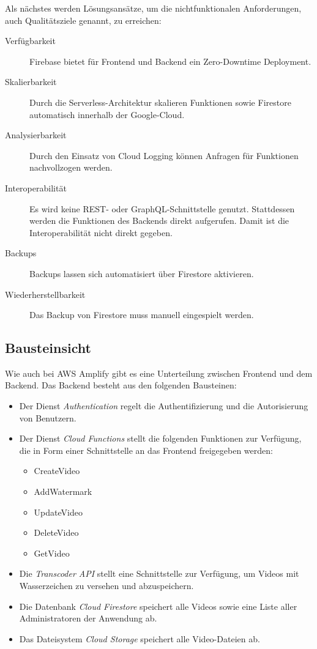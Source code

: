 Als nächstes werden Lösungsansätze, um die nichtfunktionalen Anforderungen, auch Qualitätsziele genannt, zu erreichen:

\begin{description}
   \item[Verfügbarkeit] Firebase bietet für Frontend und Backend ein Zero-Downtime Deployment.
   \item[Skalierbarkeit] Durch die Serverless-Architektur skalieren Funktionen sowie Firestore automatisch innerhalb der Google-Cloud.
   \item[Analysierbarkeit] Durch den Einsatz von Cloud Logging können Anfragen für Funktionen nachvollzogen werden.
   \item[Interoperabilität] Es wird keine \ac{REST}- oder GraphQL-Schnittstelle genutzt. Stattdessen werden die Funktionen des Backends direkt aufgerufen. Damit ist die Interoperabilität nicht direkt gegeben.
   \item[Backups] Backups lassen sich automatisiert über Firestore aktivieren.
   \item[Wiederherstellbarkeit] Das Backup von Firestore muss manuell eingespielt werden.
\end{description}

\subsection{Bausteinsicht}

Wie auch bei \ac{AWS} Amplify gibt es eine Unterteilung zwischen Frontend und dem Backend. Das Backend besteht aus den folgenden Bausteinen:

\begin{itemize}
  \item{Der Dienst \textit{Authentication} regelt die Authentifizierung und die Autorisierung von Benutzern.}
  \item{Der Dienst \textit{Cloud Functions} stellt die folgenden Funktionen zur Verfügung, die in Form einer Schnittstelle an das Frontend freigegeben werden:}
  \begin{itemize}
    \item CreateVideo
    \item AddWatermark
    \item UpdateVideo
    \item DeleteVideo
    \item GetVideo
  \end{itemize}
  \item{Die \textit{Transcoder \ac{API}} stellt eine Schnittstelle zur Verfügung, um Videos mit Wasserzeichen zu versehen und abzuspeichern.}
  \item{Die Datenbank \textit{Cloud Firestore} speichert alle Videos sowie eine Liste aller Administratoren der Anwendung ab.}
  \item{Das Dateisystem \textit{Cloud Storage} speichert alle Video-Dateien ab.}
\end{itemize}

